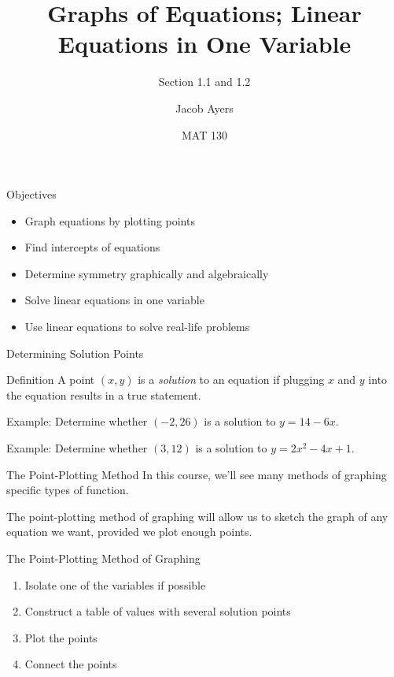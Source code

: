 \documentclass{beamer}
\title[1.1 and 1.2]{Graphs of Equations; Linear Equations in One Variable}
\subtitle{Section 1.1 and 1.2}
\author{Jacob Ayers}
\institute{Lesson \#4}
\date{MAT 130}
\begin{document}
\begin{frame}
\titlepage
\end{frame}

\begin{frame}[t]{Objectives}
\begin{itemize}
	\item Graph equations by plotting points
	\item Find intercepts of equations
	\item Determine symmetry graphically and algebraically
	\item Solve linear equations in one variable
	\item Use linear equations to solve real-life problems
\end{itemize}
\end{frame}

\begin{frame}[t]{Determining Solution Points}
\begin{block}{Definition}
A point $(x,y)$ is a \textit{solution} to an equation if plugging $x$ and $y$ into the equation results in a true statement.
\end{block} \vspace{12pt}

\pause

Example: Determine whether $(-2, 26)$ is a solution to $y = 14 - 6x$.

\pause \vfill

Example: Determine whether $(3, 12)$ is a solution to $y = 2x^2 - 4x + 1$.
\end{frame}

\begin{frame}[t]{The Point-Plotting Method}
In this course, we'll see many methods of graphing specific types of function.

The point-plotting method of graphing will allow us to sketch the graph of any equation we want, provided we plot enough points.

\pause

\begin{block}{The Point-Plotting Method of Graphing}
\begin{enumerate}[1)]
\item Isolate one of the variables if possible
\item Construct a table of values with several solution points
\item Plot the points
\item Connect the points
\end{enumerate}
\end{block}
\end{frame}
\end{document}
